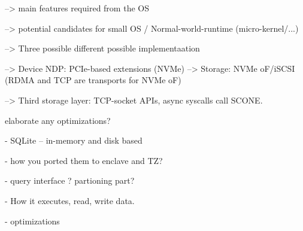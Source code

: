 --> main features required from the OS

--> potential candidates for small OS / Normal-world-runtime (micro-kernel/...)


--> Three possible different possible implementaation

--> Device NDP: PCIe-based extensions (NVMe)
--> Storage: NVMe oF/iSCSI (RDMA and TCP are transports for NVMe oF)

--> Third storage layer: TCP-socket APIs, async syscalls call SCONE.

elaborate
any optimizations? 


- SQLite -- in-memory and disk based

- how you ported them to enclave and TZ?

- query interface ? partioning part? 

- How it executes, read, write data.

- optimizations
\fi